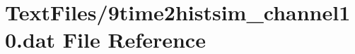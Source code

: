 \hypertarget{9time2histsim__channel10_8dat}{}\section{Text\+Files/9time2histsim\+\_\+channel10.dat File Reference}
\label{9time2histsim__channel10_8dat}
